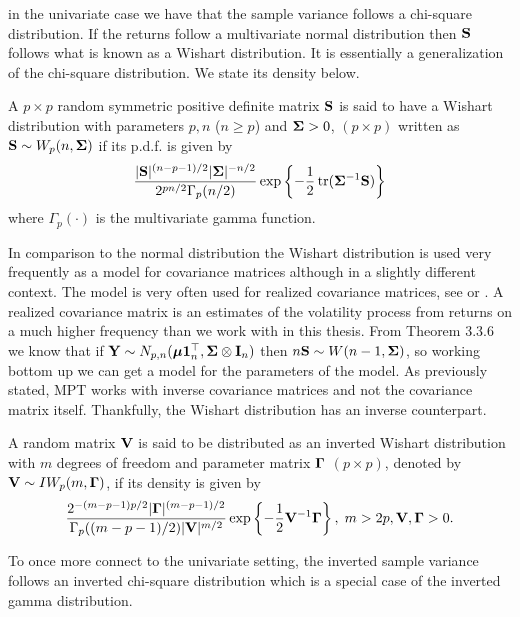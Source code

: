 \documentclass[]{book}\usepackage{knitr}
\begin{document}
in the univariate case we have that the sample variance follows a chi-square distribution. If the returns follow a multivariate normal distribution then $\mathbf{S}$ follows what is known as a Wishart distribution. It is essentially a generalization of the chi-square distribution. We state its density below.
\begin{definition}
	A $p\times p$ random symmetric positive definite matrix $\mathbf{S}$ is said to have a Wishart distribution with parameters $p, n$ ($n\geq p$) and $\mathbf{\Sigma} > 0$, $(p \times p)$ written as $\mathbf{S} \sim W_p(n, \mathbf{\Sigma})$ if its p.d.f. is given by
	\begin{equation}\label{eqn:wishart_density}
  	\frac{|\mathbf{S}|^{(n-p-1)/2} |\mathbf{\Sigma}|^{- n/2} }{2^{pn/2} \Gamma_p (n/2) } \exp\left\{-\frac{1}{2} \operatorname{tr}(\mathbf{\Sigma}^{-1}\mathbf{S})  \right\}
	\end{equation}
	where $ \Gamma_p (\cdot) $ is the multivariate gamma function.
\end{definition}
In comparison to the normal distribution the Wishart distribution is used very frequently as a model for covariance matrices although in a slightly different context.
The model is very often used for realized covariance matrices, see \cite{barndorff2004econometric} or \citet{alfelt2021modeling}.
A realized covariance matrix is an estimates of the volatility process from returns on a much higher frequency than we work with in this thesis.
From Theorem 3.3.6 we know that if $\mathbf{Y} \sim N_{p,n}(\mbox{\boldmath$\mu$} \mathbf{1}_n^\top, \mathbf{\Sigma} \otimes \mathbf{I}_n)$ then $n\mathbf{S} \sim W(n-1, \mathbf{\Sigma})$, so working bottom up we can get a model for the parameters of the model.
As previously stated, MPT works with inverse covariance matrices and not the covariance matrix itself. Thankfully, the Wishart distribution has an inverse counterpart.
\begin{definition}
	A random matrix $\mathbf{V}$ is said to be distributed as an inverted Wishart distribution with $m$ degrees of freedom and parameter matrix $\boldsymbol{\Gamma}$ $(p \times p)$, denoted by $\mathbf{V} \sim IW_p(m, \boldsymbol{\Gamma})$, if its density is given by
	\begin{equation}\label{eqn:inverse_wishart}
	\frac{2^{-(m-p-1)p/2} |\boldsymbol{\Gamma}|^{(m-p-1)/2} }{\Gamma_p ((m-p-1)/2) |\mathbf{V}|^{m/2}} \exp\left\{ -\frac{1}{2} \mathbf{V}^{-1} \boldsymbol{\Gamma} \right\}, \; m > 2p, \mathbf{V}, \boldsymbol{\Gamma} > 0.
	\end{equation}
\end{definition}
To once more connect to the univariate setting, the inverted sample variance follows an inverted chi-square distribution which is a special case of the inverted gamma distribution.
\end{document}
